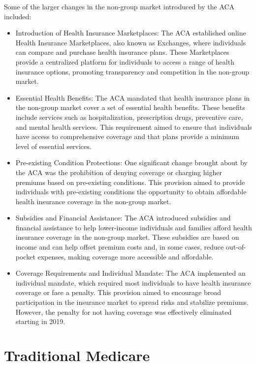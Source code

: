 \documentclass[
  letterpaper,
  DIV=11,
  numbers=noendperiod]{scrreport}
\theoremstyle{definition}
\theoremstyle{remark}
\begin{document}
Some of the larger changes in the non-group market introduced by the ACA
included:

\begin{itemize}
\item
  Introduction of Health Insurance Marketplaces: The ACA established
  online Health Insurance Marketplaces, also known as Exchanges, where
  individuals can compare and purchase health insurance plans. These
  Marketplaces provide a centralized platform for individuals to access
  a range of health insurance options, promoting transparency and
  competition in the non-group market.
\item
  Essential Health Benefits: The ACA mandated that health insurance
  plans in the non-group market cover a set of essential health
  benefits. These benefits include services such as hospitalization,
  prescription drugs, preventive care, and mental health services. This
  requirement aimed to ensure that individuals have access to
  comprehensive coverage and that plans provide a minimum level of
  essential services.
\item
  Pre-existing Condition Protections: One significant change brought
  about by the ACA was the prohibition of denying coverage or charging
  higher premiums based on pre-existing conditions. This provision aimed
  to provide individuals with pre-existing conditions the opportunity to
  obtain affordable health insurance coverage in the non-group market.
\item
  Subsidies and Financial Assistance: The ACA introduced subsidies and
  financial assistance to help lower-income individuals and families
  afford health insurance coverage in the non-group market. These
  subsidies are based on income and can help offset premium costs and,
  in some cases, reduce out-of-pocket expenses, making coverage more
  accessible and affordable.
\item
  Coverage Requirements and Individual Mandate: The ACA implemented an
  individual mandate, which required most individuals to have health
  insurance coverage or face a penalty. This provision aimed to
  encourage broad participation in the insurance market to spread risks
  and stabilize premiums. However, the penalty for not having coverage
  was effectively eliminated starting in 2019.
\end{itemize}

\hypertarget{traditional-medicare}{%
\section{Traditional Medicare}\label{traditional-medicare}}
\end{document}
